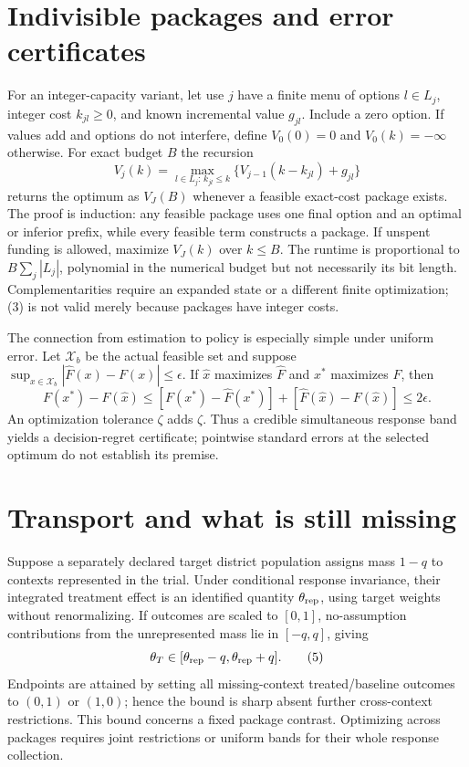 \documentclass[11pt,a4paper]{article}
\begin{document}
\section{Indivisible packages and error certificates}
For an integer-capacity variant, let use $j$ have a finite menu of options $l\in L_j$, integer cost $k_{jl}\ge0$, and known incremental value $g_{jl}$. Include a zero option. If values add and options do not interfere, define $V_0(0)=0$ and $V_0(k)=-\infty$ otherwise. For exact budget $B$ the recursion
\[
 V_j(k)=\max_{l\in L_j:\,k_{jl}\le k}
          \{V_{j-1}(k-k_{jl})+g_{jl}\}                \tag{3}
\]
returns the optimum as $V_J(B)$ whenever a feasible exact-cost package exists. The proof is induction: any feasible package uses one final option and an optimal or inferior prefix, while every feasible term constructs a package. If unspent funding is allowed, maximize $V_J(k)$ over $k\le B$. The runtime is proportional to $B\sum_j|L_j|$, polynomial in the numerical budget but not necessarily its bit length. Complementarities require an expanded state or a different finite optimization; (3) is not valid merely because packages have integer costs.

The connection from estimation to policy is especially simple under uniform error. Let $\mathcal X_b$ be the actual feasible set and suppose
$\sup_{x\in\mathcal X_b}|\widehat F(x)-F(x)|\le\epsilon$.
If $\widehat x$ maximizes $\widehat F$ and $x^*$ maximizes $F$, then
\[
 F(x^*)-F(\widehat x)
 \le [F(x^*)-\widehat F(x^*)]
     +[\widehat F(\widehat x)-F(\widehat x)]\le2\epsilon. \tag{4}
\]
An optimization tolerance $\zeta$ adds $\zeta$. Thus a credible simultaneous response band yields a decision-regret certificate; pointwise standard errors at the selected optimum do not establish its premise.

\section{Transport and what is still missing}
Suppose a separately declared target district population assigns mass $1-q$ to contexts represented in the trial. Under conditional response invariance, their integrated treatment effect is an identified quantity $\theta_{\rm rep}$, using target weights without renormalizing. If outcomes are scaled to $[0,1]$, no-assumption contributions from the unrepresented mass lie in $[-q,q]$, giving
\[
 \theta_T\in[\theta_{\rm rep}-q,\theta_{\rm rep}+q].    \tag{5}
\]
Endpoints are attained by setting all missing-context treated/baseline outcomes to $(0,1)$ or $(1,0)$; hence the bound is sharp absent further cross-context restrictions. This bound concerns a fixed package contrast. Optimizing across packages requires joint restrictions or uniform bands for their whole response collection.
\end{document}
